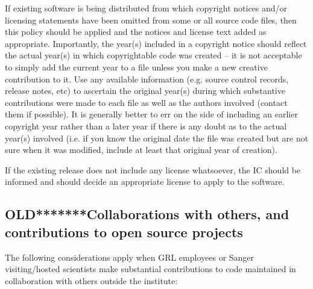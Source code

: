 \documentclass[10pt,a4paper]{article}
\begin{document}
\par If existing software is being distributed from which copyright notices 
and/or licensing statements have been omitted from some or all source 
code files, then this policy should be applied and the notices and license 
text added as appropriate. Importantly, the year(s) included in a copyright 
notice should reflect the actual year(s) in which copyrightable code was 
created -- it is not acceptable to simply add the current year to a file unless 
you make a new creative contribution to it. Use any available information 
(e.g. source control records, release notes, etc) to ascertain the original 
year(s) during which substantive contributions were made to each file as
well as the authors involved (contact them if possible). It is generally better 
to err on the side of including an earlier copyright year rather than a later 
year if there is any doubt as to the actual year(s) involved (i.e. if you know 
the original date the file was created but are not sure when it was modified, 
include at least that original year of creation). 

If the existing release does not include any license whatsoever, the IC should 
be informed and should decide an appropriate license to apply to the 
software. 


\subsection{OLD*******Collaborations with others, and contributions to open source projects}

The following considerations apply when GRL employees or Sanger visiting/hosted 
scientists make substantial contributions to code maintained in collaboration with 
others outside the institute: 
\end{document}
